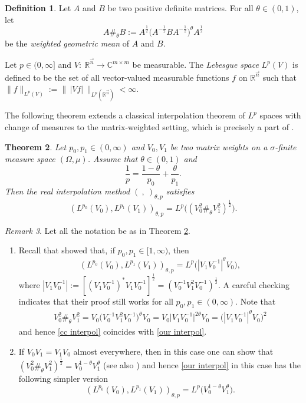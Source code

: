 \documentclass[11pt, reqno]{amsart}
\newtheorem{theorem}{Theorem}[section]
\theoremstyle{definition}
\newtheorem{definition}[theorem]{Definition}
\theoremstyle{remark}
\newtheorem{remark}[theorem]{Remark}
\numberwithin{equation}{section}
\newcommand{\C}{\mathbb C}
\newcommand{\R}{\mathbb R}
\newcommand{\vn}{\vec n}
\begin{document}
\begin{definition}
Let $A$ and $B$ be two positive definite matrices.
For all $\theta\in(0,1)$, let
$$
A\#_\theta B
:=A^{\frac12}\Big(A^{-\frac12}BA^{-\frac12}\Big)^\theta A^{\frac12}
$$
be the \emph{weighted geometric mean} of $A$ and $B$.
\end{definition}

Let $p\in(0,\infty]$ and $V:\ \R^{\vn}\to\C^{m\times m}$ be measurable.
The \emph{Lebesgue space} $L^p(V)$ is defined to be the set of
all vector-valued measurable functions $f$ on $\R^{\vn}$
such that $\|f\|_{L^p(V)}:=\|\,|Vf|\,\|_{L^p(\R^{\vn})}<\infty$.

The following theorem extends a classical interpolation theorem of
$L^p$ spaces with change of measures \cite[Theorem 5.5.1]{BL76}
to the matrix-weighted setting, which is precisely
a part of \cite[Theorem 4.4]{CC25}.

\begin{theorem}\label{interpol}
Let $p_0,p_1\in(0,\infty)$ and $V_0,V_1$ be two matrix weights
on a $\sigma$-finite measure space $(\Omega,\mu)$.
Assume that $\theta\in(0,1)$ and
\begin{equation*}
\frac1p=\frac{1-\theta}{p_0}+\frac{\theta}{p_1}.
\end{equation*}
Then the real interpolation method $(\ ,\ )_{\theta,p}$ satisfies
\begin{equation} \label{our interpol}
(L^{p_0}(V_0),L^{p_1}(V_1))_{\theta,p}
=L^p\Big((V_0^2 \#_\theta V_1^2)^{\frac12}\Big).
\end{equation}
\end{theorem}

\begin{remark}
Let all the notation be as in Theorem \ref{interpol}.
\begin{enumerate}[\rm(i)]
\item Recall that \cite[Theorem 4.4]{CC25} showed that,
if $p_0,p_1\in[1,\infty)$, then
\begin{equation} \label{cc interpol}
(L^{p_0}(V_0),L^{p_1}(V_1))_{\theta,p}
=L^p\Big(|V_1V_0^{-1}|^\theta V_0\Big),
\end{equation}
where $|V_1V_0^{-1}|:=[(V_1V_0^{-1})^*V_1V_0^{-1}]^{\frac12}
=(V_0^{-1}V_1^2V_0^{-1})^{\frac12}$.
A careful checking indicates that their proof still works
for all $p_0,p_1\in(0,\infty)$. Note that
\begin{align*}
V_0^2 \#_\theta V_1^2
=V_0\Big(V_0^{-1}V_1^2V_0^{-1}\Big)^\theta V_0
=V_0\Big|V_1V_0^{-1}\Big|^{2\theta} V_0
=\Big(|V_1V_0^{-1}|^\theta V_0\Big)^2
\end{align*}
and hence \eqref{cc interpol} coincides with \eqref{our interpol}.

\item If $V_0V_1=V_1V_0$ almost everywhere, then in this case one can show that
$(V_0^2 \#_\theta V_1^2)^{\frac12}=V_0^{1-\theta} V_1^{\theta}$
(see also \cite[Section 4.1.1]{CC25}) and hence
\eqref{our interpol} in this case has the following simpler version
$$
(L^{p_0}(V_0),L^{p_1}(V_1))_{\theta,p}
=L^p\Big(V_0^{1-\theta} V_1^{\theta}\Big).
$$
\end{enumerate}
\end{remark}
\end{document}
